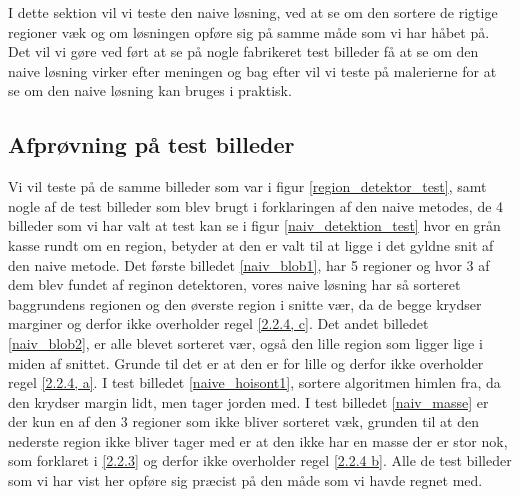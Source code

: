 {\sffamily
I dette sektion vil vi teste den naive løsning, ved at se om den sortere
de rigtige regioner væk og om løsningen opføre sig på samme måde som vi
har håbet på. Det vil vi gøre ved ført at se på nogle fabrikeret test
billeder få at se om den naive løsning virker efter meningen og bag
efter vil vi teste på malerierne for at se om den naive løsning kan
bruges i praktisk.
}
  
\subsection{Afprøvning på test billeder}
Vi vil teste på de samme billeder som var i figur
\ref{region_detektor_test}, samt nogle af de test billeder som blev
brugt i forklaringen af den naive metodes, de 4 billeder som vi har valt
at test kan se i figur \ref{naiv_detektion_test} hvor en grån kasse
rundt om en region, betyder at den er valt til at ligge i det gyldne
snit af den naive metode. Det første billedet \ref{naiv_blob1}, har 5
regioner og hvor 3 af dem blev fundet af reginon detektoren, vores naive
løsning har så sorteret baggrundens regionen og den øverste region i
snitte vær, da de begge krydser marginer og derfor ikke overholder regel
\ref{2.2.4, c}. Det andet billedet \ref{naiv_blob2}, er alle blevet
sorteret vær, også den lille region som ligger lige i miden af snittet.
Grunde til det er at den er for lille og derfor ikke overholder regel
\ref{2.2.4, a}. I test billedet \ref{naive_hoisont1}, sortere algoritmen
himlen fra, da den krydser margin lidt, men tager jorden med. I test
billedet \ref{naiv_masse} er der kun en af den 3 regioner som ikke
bliver sorteret væk, grunden til at den nederste region ikke bliver
tager med er at den ikke har en masse der er stor nok, som forklaret i
\ref{2.2.3} og derfor ikke overholder regel \ref{2.2.4 b}. Alle de test
billeder som vi har vist her opføre sig præcist på den måde som vi havde
regnet med.

